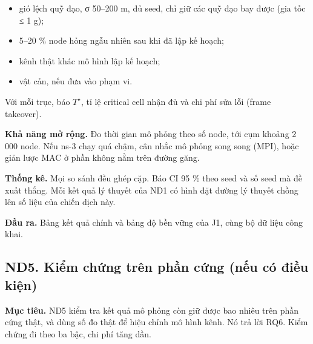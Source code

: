 \begin{itemize}
\tightlist
\item
  gió lệch quỹ đạo, σ 50--200 m, đủ seed, chỉ giữ các quỹ đạo bay được
  (gia tốc ≤ 1 g);
\item
  5--20 \% node hỏng ngẫu nhiên sau khi đã lập kế hoạch;
\item
  kênh thật khác mô hình lập kế hoạch;
\item
  vật cản, nếu đưa vào phạm vi.
\end{itemize}

Với mỗi trục, báo $T^\star$, tỉ lệ critical cell nhận đủ và chi phí sửa lỗi
(frame takeover).

\textbf{Khả năng mở rộng.} Đo thời gian mô phỏng theo số node, tới cụm
khoảng 2 000 node. Nếu ns-3 chạy quá chậm, cân nhắc mô phỏng song song
(MPI), hoặc giản lược MAC ở phần không nằm trên đường găng.

\textbf{Thống kê.} Mọi so sánh đều ghép cặp. Báo CI 95 \% theo seed và
số seed mà đề xuất thắng. Mỗi kết quả lý thuyết của ND1 có hình đặt
đường lý thuyết chồng lên số liệu của chiến dịch này.

\textbf{Đầu ra.} Bảng kết quả chính và bảng độ bền vững của J1, cùng bộ
dữ liệu công khai.

\subsection{ND5. Kiểm chứng trên phần cứng (nếu có điều kiện)}

\textbf{Mục tiêu.} ND5 kiểm tra kết quả mô phỏng còn giữ được bao nhiêu
trên phần cứng thật, và dùng số đo thật để hiệu chỉnh mô hình kênh. Nó
trả lời RQ6. Kiểm chứng đi theo ba bậc, chi phí tăng dần.

